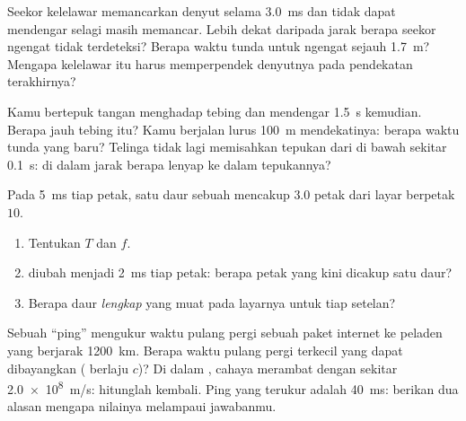 \begin{exercise}[$\star\star\star$]\label{exo:g10:signals-and-waves:12}
Seekor kelelawar memancarkan denyut  selama \qty{3.0}{ms} dan
tidak dapat mendengar  selagi masih memancar. Lebih dekat daripada
jarak berapa seekor ngengat tidak terdeteksi? Berapa waktu tunda 
untuk ngengat sejauh \qty{1.7}{m}? Mengapa kelelawar itu harus
memperpendek denyutnya pada pendekatan terakhirnya?
\end{exercise}

\begin{exercise}[$\star\star\star$]\label{exo:g10:signals-and-waves:13}
Kamu bertepuk tangan menghadap tebing dan mendengar  \qty{1.5}{s}
kemudian. Berapa jauh tebing itu? Kamu berjalan lurus \qty{100}{m}
mendekatinya: berapa waktu tunda yang baru? Telinga tidak lagi
memisahkan tepukan dari  di bawah sekitar \qty{0.1}{s}: di dalam
jarak berapa  lenyap ke dalam tepukannya?
\end{exercise}

\begin{exercise}[$\star\star\star$]\label{exo:g10:signals-and-waves:14}
Pada \qty{5}{ms} tiap petak, satu daur sebuah  mencakup $3.0$
petak dari layar berpetak $10$.
\begin{enumerate}
  \item Tentukan $T$ dan $f$.
  \item {} diubah menjadi \qty{2}{ms} tiap petak: berapa
        petak yang kini dicakup satu daur?
  \item Berapa daur \emph{lengkap} yang muat pada layarnya untuk tiap
        setelan?
\end{enumerate}
\end{exercise}

\begin{exercise}[$\star\star\star$]\label{exo:g10:signals-and-waves:15}
Sebuah ``ping'' mengukur waktu pulang pergi sebuah paket internet ke
peladen yang berjarak \qty{1200}{km}. Berapa waktu pulang pergi terkecil
yang dapat dibayangkan ( berlaju $c$)? Di dalam ,
cahaya merambat dengan sekitar \qty{2.0e8}{m/s}: hitunglah kembali. Ping
yang terukur adalah \qty{40}{ms}: berikan dua alasan mengapa nilainya
melampaui jawabanmu.
\end{exercise}

